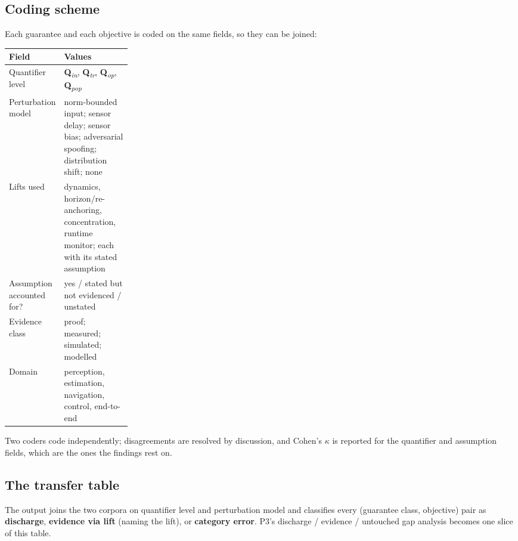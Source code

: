\documentclass[11pt,a4paper]{article}
\newcommand{\Qlvl}[1]{\textbf{Q}\textsubscript{\textit{#1}}}
\newcommand{\Qin}{\Qlvl{in}}
\newcommand{\Qtr}{\Qlvl{tr}}
\newcommand{\Qop}{\Qlvl{op}}
\newcommand{\Qpop}{\Qlvl{pop}}
\begin{document}
\subsection{Coding scheme}
Each guarantee and each objective is coded on the same fields, so they can be
joined:
\begin{center}\small
\begin{tabularx}{\linewidth}{@{}P{0.24\linewidth}Y@{}}
\toprule
\textbf{Field} & \textbf{Values} \\
\midrule
Quantifier level & \Qin, \Qtr, \Qop, \Qpop \\
Perturbation model & norm-bounded input; sensor delay; sensor bias; adversarial
spoofing; distribution shift; none \\
Lifts used & dynamics, horizon/re-anchoring, concentration, runtime monitor;
each with its stated assumption \\
Assumption accounted for? & yes / stated but not evidenced / unstated \\
Evidence class & proof; measured; simulated; modelled \\
Domain & perception, estimation, navigation, control, end-to-end \\
\bottomrule
\end{tabularx}
\end{center}

\noindent
Two coders code independently; disagreements are resolved by discussion, and
Cohen's $\kappa$ is reported for the quantifier and assumption fields, which are
the ones the findings rest on.

\subsection{The transfer table}
The output joins the two corpora on quantifier level and perturbation model and
classifies every (guarantee class, objective) pair as \textbf{discharge},
\textbf{evidence via lift} (naming the lift), or \textbf{category error}. P3's
discharge / evidence / untouched gap analysis becomes one slice of this table.

\end{document}
